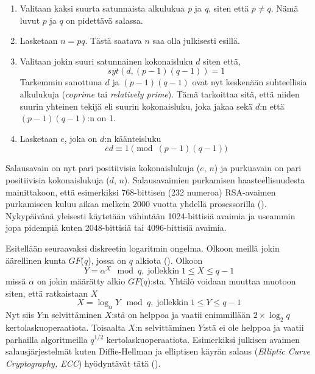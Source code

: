  \begin{enumerate}
  
      \item Valitaan kaksi suurta satunnaista alkulukua \emph{p} ja \emph{q}, siten että $p \neq q$. Nämä luvut $p$ ja $q$ on pidettävä salassa.
      
      \item Lasketaan $n = pq$. Tästä saatava $n$ saa olla julkisesti esillä.
      
      \item Valitaan jokin suuri satunnainen kokonaisluku $d$ siten että,
      \[syt(d, (p-1)(q-1)) = 1\]
      Tarkemmin sanottuna $d$ ja $(p-1)(q-1)$ ovat nyt keskenään suhteellisia alkulukuja (\emph{coprime} tai \emph{relatively prime}). Tämä tarkoittaa sitä, että niiden suurin yhteinen tekijä eli suurin kokonaisluku, joka jakaa sekä $d$:n että $(p-1)(q-1)$:n on 1.
      
      \item Lasketaan $e$, joka on $d$:n käänteisluku
      \[e d \equiv 1 \pmod{(p-1) (q-1)}\]
  \end{enumerate}
  Salausavain on nyt pari positiivisia kokonaislukuja ($e$, $n$) ja purkuavain on pari positiivisia kokonaislukuja ($d$, $n$). Salausavaimien purkamisen haasteellisuudesta mainittakoon, että esimerkiksi 768-bittisen (232 numeroa) RSA-avaimen purkamiseen kuluu aikaa melkein 2000 vuotta yhdellä prosessorilla (\cite{buchmann2016post}). Nykypäivänä yleisesti käytetään vähintään 1024-bittisiä avaimia ja useammin jopa pidempiä kuten 2048-bittisiä tai 4096-bittisiä avaimia.
  
 Esitellään seuraavaksi diskreetin logaritmin ongelma. Olkoon meillä jokin äärellinen kunta $GF$($q$), jossa on $q$ alkiota (\cite{1055638}). Olkoon
 \begin{equation}
     \label{eq10}
     Y = \alpha^{X} \mod q, \; \text{jollekkin} \; 1 \leq X \leq q-1
 \end{equation}
 missä $\alpha$ on jokin määrätty alkio $GF$($q$):sta. Yhtälö voidaan muuttaa muotoon siten, että ratkaistaan $X$ 
 \begin{equation}
     \label{eq11}
     X = \log_{\alpha} Y \mod q, \; \text{jollekkin} \; 1 \leq Y \leq q-1
 \end{equation}
 Nyt siis $Y$:n selvittäminen $X$:stä on helppoa ja vaatii enimmillään $2 \times \log_{2}q$ kertolaskuoperaatiota. Toisaalta $X$:n selvittäminen $Y$:stä ei ole helppoa ja vaatii parhailla algoritmeilla $q^{1/2}$ kertolaskuoperaatiota. Esimerkiksi julkisen avaimen salausjärjestelmät kuten Diffie-Hellman ja elliptisen käyrän salaus (\emph{Elliptic Curve Cryptography, ECC}) hyödyntävät tätä (\cite{mavroeidis2018impact}).
 
